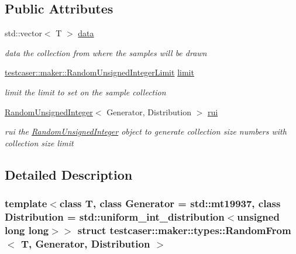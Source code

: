 \subsection*{Public Attributes}
\begin{DoxyCompactItemize}
\item 
std\+::vector$<$ T $>$ \mbox{\hyperlink{structtestcaser_1_1maker_1_1types_1_1RandomFrom_a1f346e06890d0451607551dcb0e3a426}{data}}
\begin{DoxyCompactList}\small\item\em data the collection from where the samples will be drawn \end{DoxyCompactList}\item 
\mbox{\hyperlink{classtestcaser_1_1maker_1_1RandomUnsignedIntegerLimit}{testcaser\+::maker\+::\+Random\+Unsigned\+Integer\+Limit}} \mbox{\hyperlink{structtestcaser_1_1maker_1_1types_1_1RandomFrom_a4701553931d6eafed7f3070fa64924b7}{limit}}
\begin{DoxyCompactList}\small\item\em limit the limit to set on the sample collection \end{DoxyCompactList}\item 
\mbox{\hyperlink{classtestcaser_1_1maker_1_1types_1_1RandomUnsignedInteger}{Random\+Unsigned\+Integer}}$<$ Generator, Distribution $>$ \mbox{\hyperlink{structtestcaser_1_1maker_1_1types_1_1RandomFrom_aaf9cc06f481c378f107637153a6e5f15}{rui}}
\begin{DoxyCompactList}\small\item\em rui the \mbox{\hyperlink{classtestcaser_1_1maker_1_1types_1_1RandomUnsignedInteger}{Random\+Unsigned\+Integer}} object to generate collection size numbers with collection size limit \end{DoxyCompactList}\end{DoxyCompactItemize}


\subsection{Detailed Description}
\subsubsection*{template$<$class T, class Generator = std\+::mt19937, class Distribution = std\+::uniform\+\_\+int\+\_\+distribution$<$unsigned long long$>$$>$\newline
struct testcaser\+::maker\+::types\+::\+Random\+From$<$ T, Generator, Distribution $>$}

